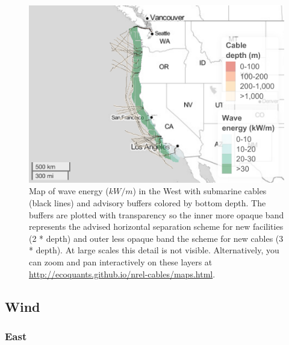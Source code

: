 \documentclass[]{article}
\begin{document}
\begin{figure}
\centering
\includegraphics{report_files/figure-latex/mapWaveWest-1.pdf}
\caption{\label{fig:mapWaveWest}Map of wave energy (\(kW/m\)) in the West
with submarine cables (black lines) and advisory buffers colored by
bottom depth. The buffers are plotted with transparency so the inner
more opaque band represents the advised horizontal separation scheme for
new facilities (2 * depth) and outer less opaque band the scheme for new
cables (3 * depth). At large scales this detail is not visible.
Alternatively, you can zoom and pan interactively on these layers at
\url{http://ecoquants.github.io/nrel-cables/maps.html}.}
\end{figure}

\hypertarget{wind-1}{%
\subsection{Wind}\label{wind-1}}

\hypertarget{east-2}{%
\subsubsection{East}\label{east-2}}
\end{document}

